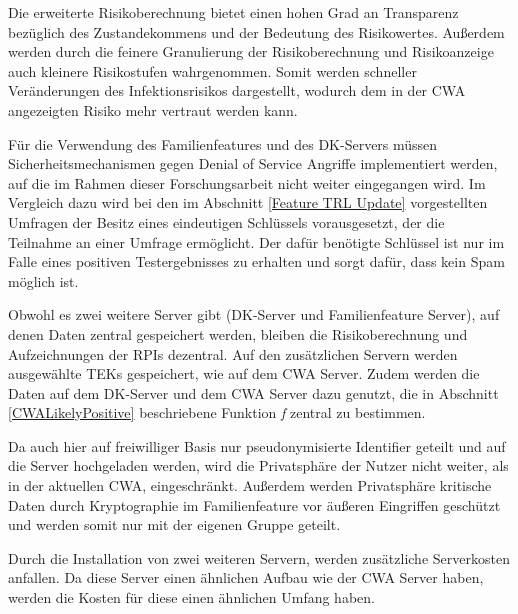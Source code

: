 \documentclass[conference,compsoc]{IEEEtran}
\begin{document}
Die erweiterte Risikoberechnung bietet einen hohen Grad an Transparenz bezüglich des Zustandekommens und der Bedeutung des Risikowertes. 
Außerdem werden durch die feinere Granulierung der Risikoberechnung und Risikoanzeige auch kleinere Risikostufen wahrgenommen. 
Somit werden schneller Veränderungen des Infektionsrisikos dargestellt, wodurch dem in der CWA angezeigten Risiko mehr vertraut werden kann.

Für die Verwendung des Familienfeatures und des DK-Servers müssen Sicherheitsmechanismen gegen Denial of Service Angriffe implementiert werden, 
auf die im Rahmen dieser Forschungsarbeit nicht weiter eingegangen wird.
Im Vergleich dazu wird bei den im Abschnitt \ref{Feature TRL Update} vorgestellten Umfragen der Besitz eines eindeutigen Schlüssels vorausgesetzt,
der die Teilnahme an einer Umfrage ermöglicht. Der dafür benötigte Schlüssel ist nur im Falle eines positiven Testergebnisses zu erhalten und sorgt dafür, dass kein Spam möglich ist.

Obwohl es zwei weitere Server gibt (DK-Server und Familienfeature Server), auf denen Daten zentral gespeichert werden, bleiben die Risikoberechnung und Aufzeichnungen der RPIs dezentral. 
Auf den zusätzlichen Servern werden ausgewählte TEKs gespeichert, wie auf dem CWA Server. 
Zudem werden die Daten auf dem DK-Server und dem CWA Server dazu genutzt, die in Abschnitt \ref{CWALikelyPositive} beschriebene Funktion \textit{f} zentral zu bestimmen.

Da auch hier auf freiwilliger Basis nur pseudonymisierte Identifier geteilt und auf die Server hochgeladen werden, wird die Privatsphäre der Nutzer nicht weiter, als in der aktuellen CWA, eingeschränkt.
Außerdem werden Privatsphäre kritische Daten durch Kryptographie im Familienfeature vor äußeren Eingriffen geschützt und werden somit nur mit der eigenen Gruppe geteilt.

Durch die Installation von zwei weiteren Servern, werden zusätzliche Serverkosten anfallen. Da diese Server einen ähnlichen Aufbau wie der CWA Server haben, 
werden die Kosten für diese einen ähnlichen Umfang haben. 
\end{document}
